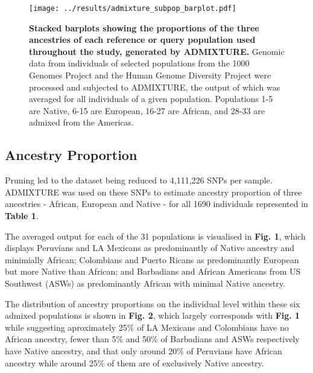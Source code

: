 \documentclass[11pt]{article}
\begin{document}
\begin{figure}[htb!]%
    \centering
    \texttt{[image: 
        ../results/admixture\_subpop\_barplot.pdf]} 
    \vspace{-0.2cm}
    \caption{\textbf{
        Stacked barplots showing the proportions of the three ancestries of each reference or query population used throughout the study, generated by ADMIXTURE.
    }
        Genomic data from individuals of selected populations from the 1000 Genomes Project and the Human Genome Diversity Project were processed and subjected to ADMIXTURE, the output of which was averaged for all individuals of a given population. Populations 1-5 are Native, 6-15 are European, 16-27 are African, and 28-33 are admixed from the Americas.
    }
\end{figure}

\subsection{Ancestry Proportion}

Pruning led to the dataset being reduced to 4,111,226 SNPs per sample. ADMIXTURE was used on these SNPs to estimate ancestry proportion of three ancestries - African, European and Native - for all 1690 individuals represented in \textbf{Table 1}.

The averaged output for each of the 31 populations is visualised in \textbf{Fig. 1}, which displays Peruvians and LA Mexicans as predominantly of Native ancestry and minimially African; Colombians and Puerto Ricans as predominantly European but more Native than African; and Barbadians and African Americans from US Southwest (ASWs) as predominantly African with minimal Native ancestry.

The distribution of ancestry proportions on the individual level within these six admixed populations is shown in \textbf{Fig. 2}, which largely corresponds with \textbf{Fig. 1} while suggesting aproximately 25\% of LA Mexicans and Colombians have no African ancestry, fewer than 5\% and 50\% of Barbadians and ASWs respectively have Native ancestry, and that only around 20\% of Peruvians have African ancestry while around 25\% of them are of exclusively Native ancestry.
\end{document}
